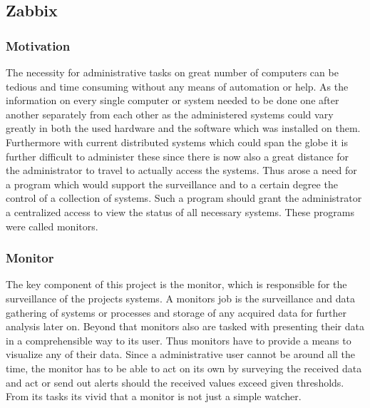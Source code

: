 \subsection{Zabbix}

\subsubsection{Motivation}
	The necessity for administrative tasks on great number of computers can be tedious and time consuming without any means of automation or help. As the information on every single computer or system needed to be done one after another separately from each other as the administered systems could vary greatly in both the used hardware and the software which was installed on them. Furthermore with current distributed systems which could span the globe it is further difficult to administer these since there is now also a great distance for the administrator to travel to actually access the systems. Thus arose a need for a program which would support the surveillance and to a certain degree the control of a collection of systems. Such a program should grant the administrator a centralized access to view the status of all necessary systems. These programs were called monitors.
\subsubsection{Monitor}
	The key component of this project is the monitor, which is responsible for the surveillance of the projects systems. A monitors job is the surveillance and data gathering of systems or processes and storage of any acquired data for further analysis later on. Beyond that monitors also are tasked with presenting their data in a comprehensible way to its user. Thus monitors have to provide a means to visualize any of their data. Since a administrative user cannot be around all the time, the monitor has to be able to act on its own by surveying the received data and act or send out alerts should the received values exceed given thresholds. From its tasks its vivid that a monitor is not just a simple watcher.\cite{zab1}

